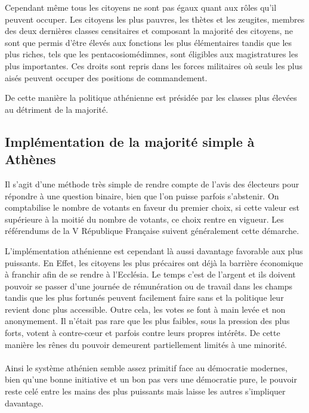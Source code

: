 \documentclass[12pt,a4paper]{report}
\begin{document}
Cependant même tous les citoyens ne sont pas égaux quant aux rôles qu'il peuvent occuper.
Les citoyens les plus pauvres, les thètes et les zeugites, membres des deux dernières classes censitaires et composant la majorité des citoyens, ne sont que permis d'être élevés aux fonctions les plus élémentaires\nocite{wiki:thetes} tandis que les plus riches, tels que les pentacosiomédimnes, sont éligibles aux magistratures les plus importantes.\nocite{wiki:penta}
Ces droits sont repris dans les forces militaires où seuls les plus aisés peuvent occuper des positions de commandement.\nocite{aristote:constitathenes}

De cette manière la politique athénienne est présidée par les classes plus élevées au détriment de la majorité.

\nocite{wiki:histdemo}
\subsection{Implémentation de la majorité simple à Athènes}
Il s'agit d'une méthode très simple de rendre compte de l'avis des électeurs pour répondre à une question binaire, bien que l'on puisse parfois s'abstenir.
On comptabilise le nombre de votants en faveur du premier choix, si cette valeur est supérieure à la moitié du nombre de votants, ce choix rentre en vigueur.
Les référendums de la V République Française suivent généralement cette démarche.

L'implémentation athénienne est cependant là aussi davantage favorable aux plus puissants.
En Effet, les citoyens les plus précaires ont déjà la barrière économique à franchir afin de se rendre à l'Ecclésia. Le temps c'est de l'argent et ils doivent pouvoir se passer d'une journée de rémunération ou de travail dans les champs tandis que les plus fortunés peuvent facilement faire sans et la politique leur revient donc plus accessible. Outre cela, les votes se font à main levée et non anonymement. Il n'était pas rare que les plus faibles, sous la pression des plus forts, votent à contre-cœur et parfois contre leurs propres intérêts. De cette manière les rênes du pouvoir demeurent partiellement limités à une minorité.

\paragraph{} %
Ainsi le système athénien semble assez primitif face au démocratie modernes, bien qu'une bonne initiative et un bon pas vers une démocratie pure, le pouvoir reste celé entre les mains des plus puissants mais laisse les autres s'impliquer davantage.
\end{document}
